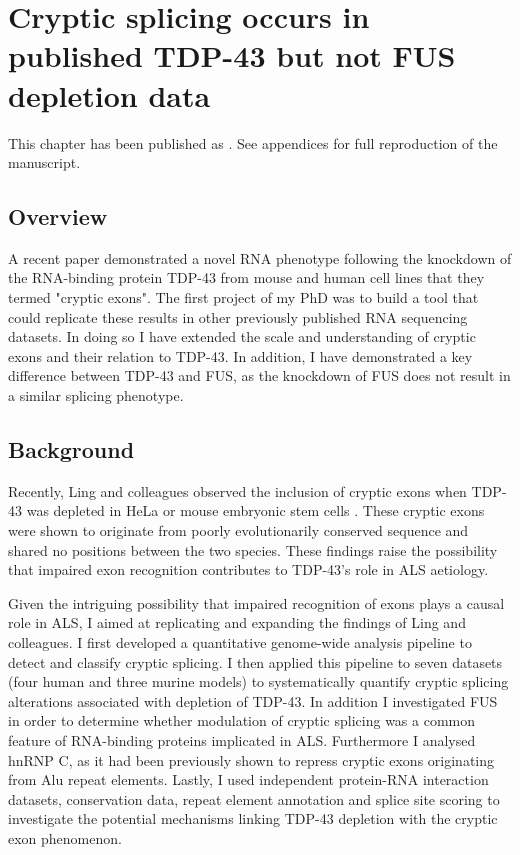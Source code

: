 \chapter{Cryptic splicing occurs in published TDP-43 but not FUS depletion data}
\label{chapter:cryptic_exons}

This chapter has been published as \citep{Humphrey2017}. See appendices for full reproduction of the manuscript.

\section{Overview}
A recent paper \citep{Ling2015} demonstrated a novel RNA phenotype following the knockdown of the RNA-binding protein TDP-43 from mouse and human cell lines that they termed "cryptic exons". The first project of my PhD was to build a tool that could replicate these results in other previously published RNA sequencing datasets. In doing so I have extended the scale and understanding of cryptic exons and their relation to TDP-43. In addition, I have demonstrated a key difference between TDP-43 and FUS, as the knockdown of FUS does not result in a similar splicing phenotype.

\section{Background}

Recently, Ling and colleagues observed the inclusion of cryptic exons when TDP-43 was depleted in HeLa or mouse embryonic stem cells \citep{Ling2015}. These cryptic exons were shown to originate from poorly evolutionarily conserved sequence and shared no positions between the two species. These findings raise the possibility that impaired exon recognition contributes to TDP-43's role in ALS aetiology.

Given the intriguing possibility that impaired recognition of exons plays a causal role in ALS, I aimed at replicating and expanding the findings of Ling and colleagues. I first developed a quantitative genome-wide analysis pipeline to detect and classify cryptic splicing. I then applied this pipeline to seven datasets (four human and three murine models) to systematically quantify cryptic splicing alterations associated with depletion of TDP-43. In addition I investigated FUS in order to determine whether modulation of cryptic splicing was a common feature of RNA-binding proteins implicated in ALS. Furthermore I analysed hnRNP C, as it had been previously shown to repress cryptic exons originating from Alu repeat elements. Lastly, I used independent protein-RNA interaction datasets, conservation data, repeat element annotation and splice site scoring to investigate the potential mechanisms linking TDP-43 depletion with the cryptic exon phenomenon.

